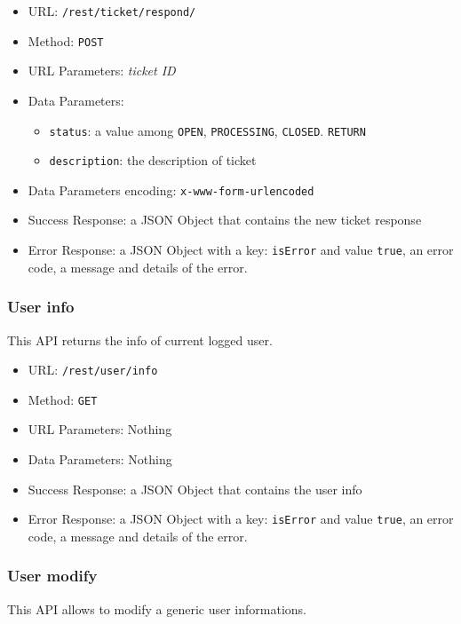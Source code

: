 \begin{itemize}
    \item URL: \texttt{/rest/ticket/respond/}
    \item Method: \texttt{POST}
    \item URL Parameters: \textit{ticket ID}
    \item Data Parameters:
    \begin{itemize}
        \item \texttt{status}: a value among \texttt{OPEN}, \texttt{PROCESSING}, \texttt{CLOSED}. \texttt{RETURN}
        \item \texttt{description}: the description of ticket
    \end{itemize}
    \item Data Parameters encoding: \texttt{x-www-form-urlencoded}
    \item Success Response: a JSON Object that contains the new ticket response
    \item Error Response: a JSON Object with a key: \texttt{isError}  and value \texttt{true}, an error code, a message and details of the error.
\end{itemize}

\subsubsection*{User info}

This API returns the info of current logged user.

\begin{itemize}
    \item URL: \texttt{/rest/user/info}
    \item Method: \texttt{GET}
    \item URL Parameters: Nothing
    \item Data Parameters: Nothing
    \item Success Response: a JSON Object that contains the user info
    \item Error Response: a JSON Object with a key: \texttt{isError}  and value \texttt{true}, an error code, a message and details of the error.
\end{itemize}


\subsubsection*{User modify}

This API allows to modify a generic user informations.

